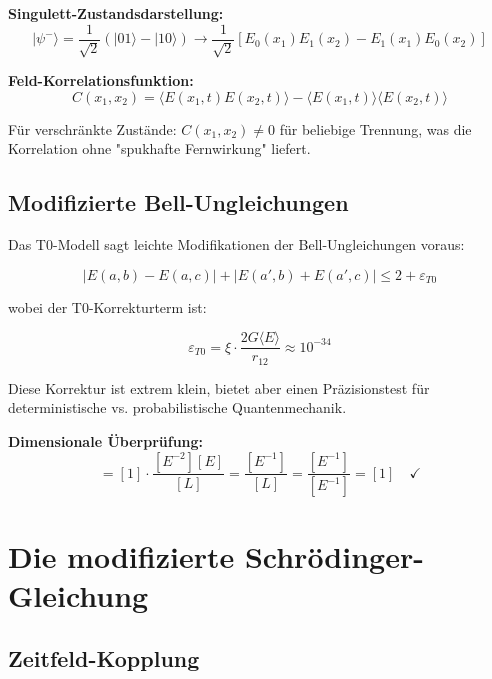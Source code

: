 \documentclass[12pt,a4paper]{report}
\begin{document}
	\textbf{Singulett-Zustandsdarstellung:}
	\begin{equation}
		|\psi^-\rangle = \frac{1}{\sqrt{2}}(|01\rangle - |10\rangle) \rightarrow \frac{1}{\sqrt{2}}[E_0(x_1)E_1(x_2) - E_1(x_1)E_0(x_2)]
	\end{equation}
	
	\textbf{Feld-Korrelationsfunktion:}
	\begin{equation}
		C(x_1,x_2) = \langle E(x_1,t) E(x_2,t) \rangle - \langle E(x_1,t) \rangle \langle E(x_2,t) \rangle
	\end{equation}
	
	Für verschränkte Zustände: $C(x_1,x_2) \neq 0$ für beliebige Trennung, was die Korrelation ohne "spukhafte Fernwirkung" liefert.
	
	\subsection{Modifizierte Bell-Ungleichungen}
	\label{subsec:modified_bell_inequalities}
	
	Das T0-Modell sagt leichte Modifikationen der Bell-Ungleichungen voraus:
	
	\begin{equation}
		|E(a,b) - E(a,c)| + |E(a',b) + E(a',c)| \leq 2 + \varepsilon_{T0}
	\end{equation}
	
	wobei der T0-Korrekturterm ist:
	
	\begin{equation}
		\varepsilon_{T0} = \xi \cdot \frac{2G\langle E \rangle}{r_{12}} \approx 10^{-34}
	\end{equation}
	
	Diese Korrektur ist extrem klein, bietet aber einen Präzisionstest für deterministische vs. probabilistische Quantenmechanik.
	
	\textbf{Dimensionale Überprüfung:}
	\begin{equation}
		[\varepsilon_{T0}] = [1] \cdot \frac{[E^{-2}][E]}{[L]} = \frac{[E^{-1}]}{[L]} = \frac{[E^{-1}]}{[E^{-1}]} = [1] \quad \checkmark
	\end{equation}
	
	\section{Die modifizierte Schrödinger-Gleichung}
	\label{sec:modified_schrodinger}
	
	\subsection{Zeitfeld-Kopplung}
	\label{subsec:time_field_coupling}
	
\end{document}
